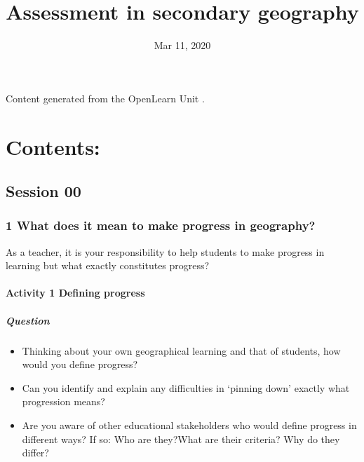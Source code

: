 \documentclass[letterpaper,10pt,english]{sphinxmanual}
\title{Assessment in secondary geography}
\date{Mar 11, 2020}
\author{}
\begin{document}
\pagestyle{empty}
\sphinxmaketitle
\pagestyle{plain}
\sphinxtableofcontents
\pagestyle{normal}
\label{\detokenize{index::doc}}


Content generated from the OpenLearn Unit .


\chapter{Contents:}
\label{\detokenize{index:contents}}

\section{Session 00}
\label{\detokenize{index:session-00}}

\subsection{1 What does it mean to make progress in geography?}
\label{\detokenize{content/session_00/Part_00_01:1-What-does-it-mean-to-make-progress-in-geography?}}\label{\detokenize{content/session_00/Part_00_01::doc}}
As a teacher, it is your responsibility to help students to make progress in learning but what exactly constitutes progress?


\subsubsection{Activity 1 Defining progress}
\label{\detokenize{content/session_00/Part_00_01:Activity-1-Defining-progress}}


\paragraph{Question}
\label{\detokenize{content/session_00/Part_00_01:Question}}\begin{itemize}
\item {} 
Thinking about your own geographical learning and that of students, how would you define progress?

\item {} 
Can you identify and explain any difficulties in ‘pinning down’ exactly what progression means?

\item {} 
Are you aware of other educational stakeholders who would define progress in different ways? If so: Who are they?What are their criteria? Why do they differ?

\end{itemize}
\end{document}
